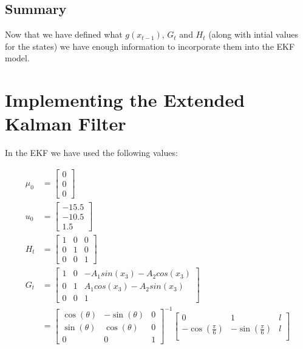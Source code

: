 \documentclass{article}
\begin{document}
\subsection{Summary}
\label{subsec:ekf_def_summary}

Now that we have defined what $g(x_{t - 1})$, $G_{t}$ and $H_{t}$ (along with
 intial values for the states) we have enough information to incorporate them
  into the EKF model.



\newpage
\section{Implementing the Extended Kalman Filter}

In the EKF we have used the following values:

\begin{align*}
	\mu_{0} &= 
		\begin{bmatrix}
			0 \\
			0 \\
			0
		\end{bmatrix} \\
	u_{0} &= 
	\begin{bmatrix}
		-15.5 \\
		-10.5 \\
		1.5
	\end{bmatrix} \\
	H_{t} &=
	\begin{bmatrix}
		1 & 0 & 0 \\
		0 & 1 & 0 \\
		0 & 0 & 1
	\end{bmatrix} \\
	G_{t} 
		&= \begin{bmatrix}
			1 & 0 & -A_{1} sin(x_{3}) - A_{2} cos(x_{3})  \\
			0 & 1 & A_{1} cos(x_{3}) - A_{2} sin(x_{3}) \\
			0 & 0 & 1
		\end{bmatrix} \\
	    &= 
	        \begin{bmatrix}
		        \cos{(\theta)} & -\sin{(\theta)} & 0 \\
		        \sin{(\theta)} & \cos{(\theta)} & 0 \\
		        0 & 0 & 1
	        \end{bmatrix}^{-1}
	        \begin{bmatrix}
	            0 & 1 & l \\
	          	-\cos(\frac{\pi}{6}) & -\sin(\frac{\pi}{6}) & l \\

\end{bmatrix}
\end{align*}
\end{document}
